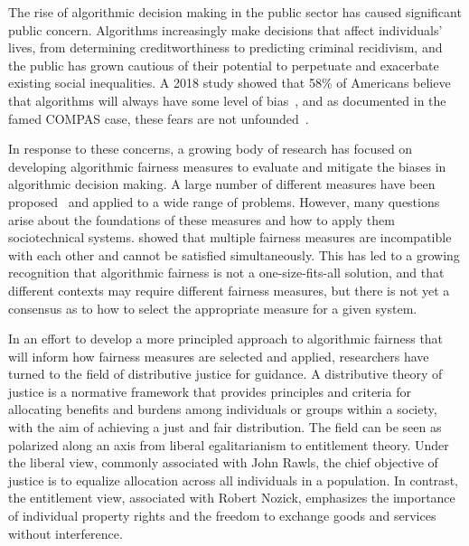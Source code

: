 
The rise of algorithmic decision making in the public sector has caused
significant public concern. Algorithms increasingly make decisions that affect
individuals' lives, from determining creditworthiness to predicting criminal 
recidivism, and the public has grown cautious of their potential to perpetuate
and exacerbate existing social inequalities. A 2018 study showed that 58\% of
Americans believe that algorithms will always have some level of
bias~\citep{Smith_2018}, and as documented in the famed COMPAS case, these fears
are not unfounded~\citep{Angwin_2016}.

In response to these concerns, a growing body of research has focused on
developing algorithmic fairness measures to evaluate and mitigate the biases
in algorithmic decision making. A large number of different measures have been
proposed~\citep{CorbettDavies_2023} and applied to a wide range of problems.
However, many questions arise about the foundations of these measures and how to
apply them sociotechnical systems. \citep{Hardt_2016} showed that multiple
fairness measures are incompatible with each other and cannot be satisfied
simultaneously. This has led to a growing recognition that algorithmic fairness
is not a one-size-fits-all solution, and that different contexts may require
different fairness measures, but there is not yet a consensus as to how to
select the appropriate measure for a given system.

In an effort to develop a more principled approach to algorithmic fairness that
will inform how fairness measures are selected and applied,
researchers have turned to the field of distributive justice for guidance.
A distributive theory of justice is a normative framework that provides
principles and criteria for allocating benefits and burdens among individuals or
groups within a society, with the aim of achieving a just and fair distribution.
The field can be seen as polarized along an axis from liberal egalitarianism to
entitlement theory. Under the liberal view, commonly associated with John Rawls, 
the chief objective of justice is to equalize allocation across all individuals
in a population. In contrast, the entitlement view, associated with Robert
Nozick, emphasizes the importance of individual property rights and the freedom
to exchange goods and services without interference. 

